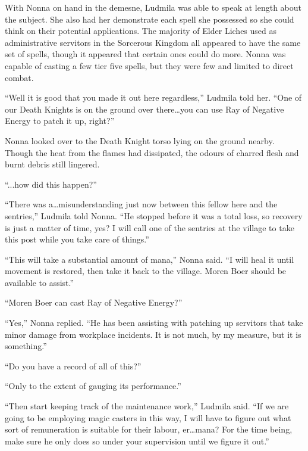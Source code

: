  

With Nonna on hand in the demesne, Ludmila was able to speak at length about the subject. She also had her demonstrate each spell she possessed so she could think on their potential applications. The majority of Elder Liches used as administrative servitors in the Sorcerous Kingdom all appeared to have the same set of spells, though it appeared that certain ones could do more. Nonna was capable of casting a few tier five spells, but they were few and limited to direct combat.

 

“Well it is good that you made it out here regardless,” Ludmila told her. “One of our Death Knights is on the ground over there…you can use Ray of Negative Energy to patch it up, right?”

 

Nonna looked over to the Death Knight torso lying on the ground nearby. Though the heat from the flames had dissipated, the odours of charred flesh and burnt debris still lingered.

 

“...how did this happen?”

 

“There was a…misunderstanding just now between this fellow here and the sentries,” Ludmila told Nonna. “He stopped before it was a total loss, so recovery is just a matter of time, yes? I will call one of the sentries at the village to take this post while you take care of things.”

 

“This will take a substantial amount of mana,” Nonna said. “I will heal it until movement is restored, then take it back to the village. Moren Boer should be available to assist.”

 

“Moren Boer can cast Ray of Negative Energy?”

 

“Yes,” Nonna replied. “He has been assisting with patching up servitors that take minor damage from workplace incidents. It is not much, by my measure, but it is something.”

 

“Do you have a record of all of this?”

 

“Only to the extent of gauging its performance.”

 

“Then start keeping track of the maintenance work,” Ludmila said. “If we are going to be employing magic casters in this way, I will have to figure out what sort of remuneration is suitable for their labour, er…mana? For the time being, make sure he only does so under your supervision until we figure it out.”

